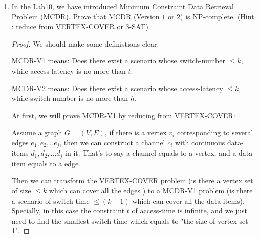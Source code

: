 \documentclass[12pt,a4paper]{article}
\theoremstyle{definition}
\begin{document}
\begin{enumerate}
\begin{proof}
       Assume one clause as $(x_1\bigvee x_2 \bigvee x_3) $, then it equals to a NAE-4 clause $N_4(x_1,x_2,x_3,F)$. In the NAE-4 clause, the result will be true iff it has at least one true value among $x_1,x_2,x_3$, which can solve the 3-SAT prblem. Therefore, we can get: 3-SAT  $\leq_P$ NAE-4-SAT.
       
       Then we can reduce the NAE-4-SAT problem to a NAE-3-SAT problem:
       
       Assume one clause as $N_4(x_1,x_2,x_3,x_4)$, and construct a NAE-3 format as follows: ($s$ is a binary variable) $$N=N_3(x_1,x_2,s)\bigwedge N_3(x_3,x_4,
       \overline s)$$  It's easy to see that if $x_1,x_2,x_3,x_4$ are  all equal, no matter what value the $s$ is, $N$ is always false. Then if $x_1,x_2,x_3,x_4$ are not all equal, we can always find a value for $s$ and make $N$ true. Therefore, we can sovle the NAE-4-SAT problem by constructing a such NAE-3 format formula. Then, we can get: NAE-4-SAT $\leq_P$ NAE-3-SAT.
       
       So, 3-SAT  $\leq_P$ NAE-4-SAT $\leq_P$ NAE-3-SAT, and NAE-3-SAT is NP-complete.
       
    \end{proof}

	\item In the Lab10, we have introduced Minimum Constraint Data Retrieval Problem (MCDR). Prove that MCDR (Version $1$ or $2$) is NP-complete. (Hint : reduce from VERTEX-COVER or $3$-SAT)
	   \begin{proof}
 		We should make some definistions clear:
 		
 		MCDR-V1 means: Does there exist a scenario whose switch-number $\leq k$,  while access-latency is no more than $t$.
 		
 		MCDR-V2 means: Does there exist a scenario whose access-latency $\leq k$,  while switch-number is no more than $h$.
 		
 		At first, we will prove MCDR-V1 by reducing from VERTEX-COVER:
 		
 		Assume a graph $G=(V,E)$, if there is a vertex $v_i$ corresponding to several edges $e_1,e_2,..e_j$, then we can construct a channel
 		$c_i$ with continuous data-items $d_1,d_2,...d_j$ in it. That's to say a channel equals to a vertex, and a data-item  equals to a edge.
 		
 		Then we can transform the VERTEX-COVER problem (is there a vertex set of size $\leq k$ which can cover all the edges ) to a MCDR-V1 problem (is there a scenario of switch-time $\leq (k-1)$ which can cover all the data-items). Specially, in this case the constraint $t$ of access-time is infinite, and we just need to find the smallest switch-time which equals to "the size of vertex-set - 1".
 		

\end{proof}
\end{enumerate}
\end{document}
